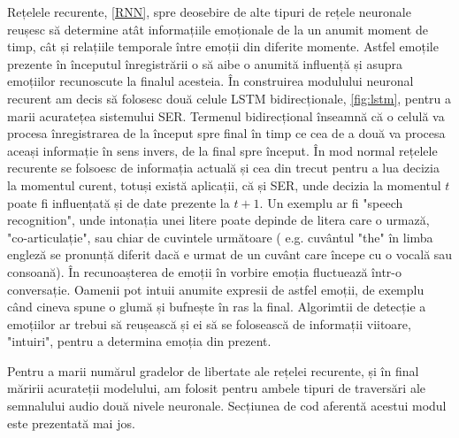 \documentclass[a4paper,12pt]{book}
\begin{document}
				Rețelele recurente, \ref{RNN}, spre deosebire de alte tipuri de rețele neuronale reușesc să determine atât informațiile emoționale de la un anumit moment de timp, cât  și relațiile temporale între emoții din diferite momente. Astfel emoțile prezente în începutul înregistrării o să aibe o anumită influență și asupra emoțiilor recunoscute la finalul acesteia. În construirea modulului neuronal recurent am decis să folosesc două celule LSTM bidirecționale, \ref{fig:lstm}, pentru a marii acuratețea sistemului SER. Termenul bidirecțional înseamnă că o celulă va procesa înregistrarea de la început spre final în timp ce cea de a două va procesa aceași informație în sens invers, de la final spre început. În mod normal rețelele recurente se folsoesc de informația actuală și cea din trecut pentru a lua decizia la momentul curent, totuși există aplicații, că și SER, unde decizia la momentul $t$ poate fi influențată și de date prezente la $t+1$. Un exemplu ar fi "speech recognition", unde intonația unei litere poate depinde de litera care o urmază, "co-articulație", sau chiar de cuvintele următoare ( e.g. cuvântul "the" în limba engleză se pronunță diferit dacă e urmat de un cuvânt care începe cu o vocală sau consoană). În recunoașterea de emoții în vorbire emoția fluctuează într-o conversație. Oamenii pot intuii anumite expresii de astfel emoții, de exemplu când cineva spune o glumă și bufnește în ras la final. Algorimtii de detecție a emoțiilor ar trebui să reușească și ei să se folosească de informații viitoare, "intuiri", pentru a determina emoția din prezent. \par Pentru a marii numărul gradelor de libertate ale rețelei recurente, și în final măririi acurateții modelului, am folosit pentru ambele tipuri de traversări ale semnalului audio două nivele neuronale. Secțiunea de cod aferentă acestui modul este prezentată mai jos.\par 
\end{document}

